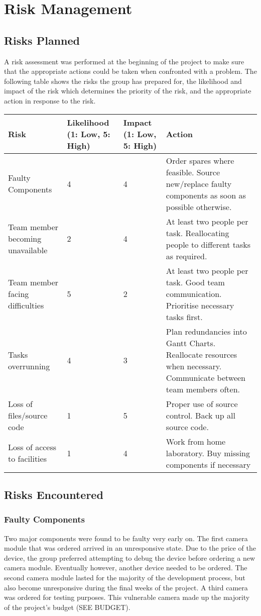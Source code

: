 \section{Risk Management}

\subsection{Risks Planned}
A risk assessment was performed at the beginning of the project to make sure that the appropriate actions could be taken when confronted with a problem. 
The following table shows the risks the group has prepared for, the likelihood and 
impact of the risk which determines the priority of the risk, and the appropriate action in response to the risk.

\begin{center}
	\begin{tabular}{ | p{4cm} | p{2cm} | p{2cm} | p{5cm} | }
	\hline
	\textbf{Risk} & \textbf{Likelihood (1: Low, 5: High)} & 
	\textbf{Impact (1: Low, 5: High)} & \textbf{Action} \\ \hline
	Faulty Components & 4 & 4 & Order spares where feasible.
	Source new/replace faulty components as soon as possible otherwise. \\ \hline
	Team member becoming unavailable & 2 & 4 & At least two people per task.
	Reallocating people to different tasks as required. \\ \hline
	Team member facing difficulties & 5 & 2 & At least two people per task.
	Good team communication. Prioritise necessary tasks first. \\ \hline
	Tasks overrunning & 4 & 3 & Plan redundancies into Gantt Charts.
	Reallocate resources when necessary. Communicate between team members often. \\ \hline
	Loss of files/source code & 1 & 5 & Proper use of source control. Back up all source code. \\ \hline
	Loss of access to facilities & 1 & 4 & Work from home laboratory. 
	Buy missing components if necessary \\
	\hline
	\end{tabular}
\end{center}

\subsection{Risks Encountered}

\subsubsection{Faulty Components}
Two major components were found to be faulty very early on. 
The first camera module that was ordered arrived in an unresponsive state. 
Due to the price of the device, the group preferred attempting to debug the device before ordering a new camera module. 
Eventually however, another device needed to be ordered. 
The second camera module lasted for the majority of the development process, but also 
become unresponsive during the final weeks of the project. A third camera was ordered for testing purposes. 
This vulnerable camera made up the majority of the project's budget (SEE BUDGET).

